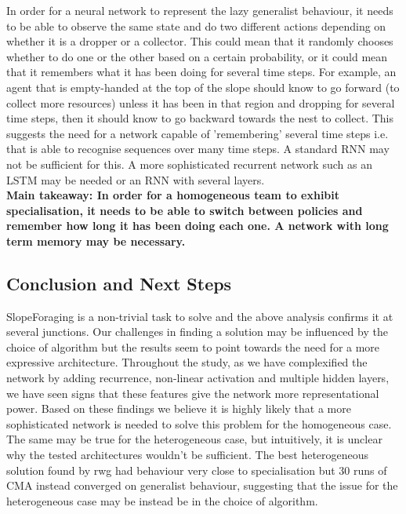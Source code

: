 \documentclass[12pt]{article}
\begin{document}
In order for a neural network to represent the lazy generalist behaviour, it needs to be able to observe the same state and do two different actions depending on whether it is a dropper or a collector. 
This could mean that it randomly chooses whether to do one or the other based on a certain probability, or it could mean that it remembers what it has been doing for several time steps.
For example, an agent that is empty-handed at the top of the slope should know to go forward (to collect more resources) unless it has been in that region and dropping for several time steps, then it should know to go backward towards the nest to collect.
This suggests the need for a network capable of 'remembering' several time steps i.e. that is able to recognise sequences over many time steps.
A standard RNN may not be sufficient for this.
A more sophisticated recurrent network such as an LSTM may be needed or an RNN with several layers.\\

\textbf{Main takeaway: In order for a homogeneous team to exhibit specialisation, it needs to be able to switch between policies and remember how long it has been doing each one.
A network with long term memory may be necessary.}

\subsection{Conclusion and Next Steps} \label{conclusion}

SlopeForaging is a non-trivial task to solve and the above analysis confirms it at several junctions.
Our challenges in finding a solution may be influenced by the choice of algorithm but the results seem to point towards the need for a more expressive architecture.
Throughout the study, as we have complexified the network by adding recurrence, non-linear activation and multiple hidden layers, we have seen signs that these features give the network more representational power.
Based on these findings we believe it is highly likely that a more sophisticated network is needed to solve this problem for the homogeneous case.
The same may be true for the heterogeneous case, but intuitively, it is unclear why the tested architectures wouldn't be sufficient.
The best heterogeneous solution found by rwg had behaviour very close to specialisation but 30 runs of CMA instead converged on generalist behaviour, suggesting that the issue for the heterogeneous case may be instead be in the choice of algorithm.\\
\end{document}
